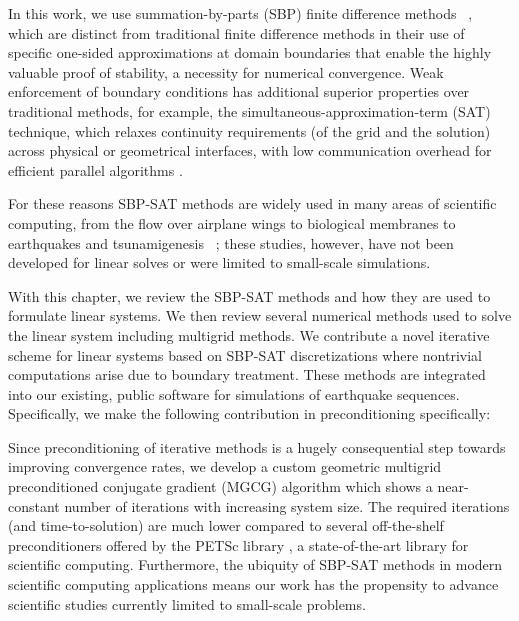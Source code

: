 In this work, we use summation-by-parts (SBP) finite difference
methods ~\cite{KS74, Strand94, MN04, SVARD201417}, which are distinct from traditional finite difference
methods in their use of specific one-sided approximations at domain boundaries that enable the highly valuable proof of stability, a necessity for numerical convergence. Weak enforcement of boundary conditions has additional superior properties over traditional methods, for example, the simultaneous-approximation-term (SAT) technique, which relaxes continuity requirements (of the grid and the solution) across physical or geometrical interfaces, with low communication overhead for efficient parallel algorithms \cite{Fernandez2014}.

For these reasons SBP-SAT methods are widely used in many areas of scientific computing, from the flow over airplane wings to biological membranes to earthquakes and tsunamigenesis ~\cite{Ying2007, NordstromEriksson2010, Swim2011, petersson_stable, Lotto2015, EricksonDay2016}; these studies, however, have not been developed for linear solves or were limited to small-scale simulations. 


With this chapter, we review the SBP-SAT methods and how they are used to formulate linear systems.
We then review several numerical methods used to solve the linear system including multigrid methods.
We contribute a novel iterative scheme for linear systems based on SBP-SAT discretizations where nontrivial computations arise due to boundary treatment. These methods are integrated into our existing, public software for simulations of earthquake sequences. Specifically, we make the following contribution in preconditioning specifically:

Since preconditioning of iterative methods is a hugely consequential step towards improving convergence rates, we develop a custom geometric multigrid preconditioned conjugate gradient (MGCG) algorithm which shows a near-constant number of iterations with increasing system size. The required iterations (and time-to-solution) are much lower compared to several off-the-shelf preconditioners offered by the PETSc library \cite{petsc-web-page}, a state-of-the-art library for scientific computing.
Furthermore, the ubiquity of SBP-SAT methods in modern scientific computing applications means our work has the propensity to advance scientific studies currently limited to small-scale problems.

